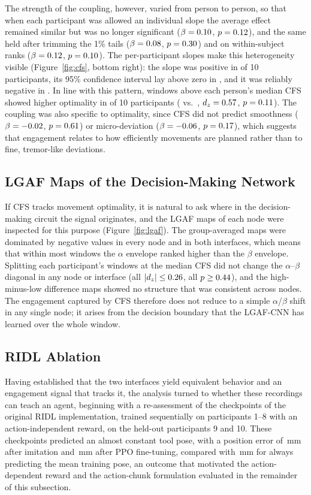 \documentclass[utf8]{frontiers_suppmat}
\begin{document}
The strength of the coupling, however, varied from person to person, so that when each participant was allowed an individual slope the average effect remained similar but was no longer significant ($\beta=0.10$, $p=0.12$), and the same held after trimming the 1\% tails ($\beta=0.08$, $p=0.30$) and on within-subject ranks ($\beta=0.12$, $p=0.10$). The per-participant slopes make this heterogeneity visible (Figure~\ref{fig:cfs}, bottom right): the slope was positive in \slPos{} of 10 participants, its 95\% confidence interval lay above zero in \slSigPos{}, and it was reliably negative in \slSigNeg{}. In line with this pattern, windows above each person's median CFS showed higher optimality in \msNup{} of 10 participants (\msHi{} vs.\ \msLo{}, $d_z=0.57$, $p=0.11$). The coupling was also specific to optimality, since CFS did not predict smoothness ($\beta=-0.02$, $p=0.61$) or micro-deviation ($\beta=-0.06$, $p=0.17$), which suggests that engagement relates to how efficiently movements are planned rather than to fine, tremor-like deviations.

\subsection{LGAF Maps of the Decision-Making Network}
If CFS tracks movement optimality, it is natural to ask where in the decision-making circuit the signal originates, and the LGAF maps of each node were inspected for this purpose (Figure~\ref{fig:lgaf}). The group-averaged maps were dominated by negative values in every node and in both interfaces, which means that within most windows the $\alpha$ envelope ranked higher than the $\beta$ envelope. Splitting each participant's windows at the median CFS did not change the $\alpha$--$\beta$ diagonal in any node or interface (all $|d_z|\le0.26$, all $p\ge0.44$), and the high-minus-low difference maps showed no structure that was consistent across nodes. The engagement captured by CFS therefore does not reduce to a simple $\alpha$/$\beta$ shift in any single node; it arises from the decision boundary that the LGAF-CNN has learned over the whole window.

\subsection{RIDL Ablation}
Having established that the two interfaces yield equivalent behavior and an engagement signal that tracks it, the analysis turned to whether these recordings can teach an agent, beginning with a re-assessment of the checkpoints of the original RIDL implementation, trained sequentially on participants 1--8 with an action-independent reward, on the held-out participants 9 and 10. These checkpoints predicted an almost constant tool pose, with a position error of \tBcErr{}\,mm after imitation and \tRidlErr{}\,mm after PPO fine-tuning, compared with \tBase{}\,mm for always predicting the mean training pose, an outcome that motivated the action-dependent reward and the action-chunk formulation evaluated in the remainder of this subsection.
\end{document}
